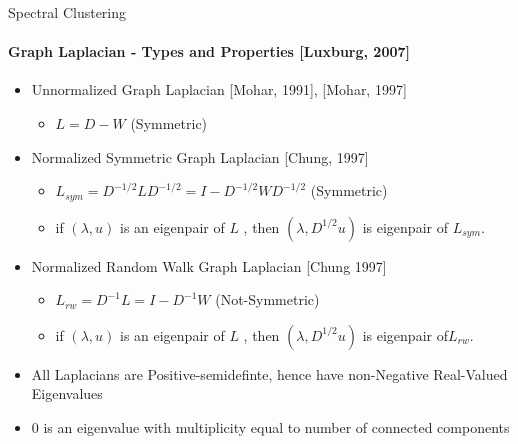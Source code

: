 \documentclass[10pt,a4paper, nocenter]{beamer}
\begin{document}
	\begin{frame}{Spectral Clustering}
		\framesubtitle{Graph Laplacian - Types and Properties [Luxburg, 2007]}
		
		\begin{itemize}
			\item<1-> Unnormalized Graph Laplacian [Mohar, 1991], [Mohar, 1997]
				\begin{itemize}
					\item $L = D-W$ (Symmetric)
				\end{itemize}
			\item<2-> Normalized Symmetric Graph Laplacian [Chung, 1997]
				\begin{itemize}
					\item $L_{sym} = D^{-1/2}LD^{-1/2} = I - D^{-1/2}WD^{-1/2}$ (Symmetric)
					\item if $(\lambda,u)$ is an eigenpair of $L$ , then $(\lambda, D^{1/2}u)$ is eigenpair of $L_{sym}$.
				\end{itemize}
			\item<3-> Normalized Random Walk Graph Laplacian [Chung 1997]
				\begin{itemize}
					\item $L_{rw} = D^{-1}L = I - D^{-1}W$ (Not-Symmetric)
					\item if $(\lambda,u)$ is an eigenpair of $L$ , then $(\lambda, D^{1/2}u)$ is eigenpair of$L_{rw}$.
				\end{itemize}
			\item<4-> All Laplacians are Positive-semidefinte, hence have non-Negative Real-Valued Eigenvalues
			\item<5-> 0 is an eigenvalue with multiplicity equal to number of connected components
		\end{itemize}
	\end{frame}
\end{document}
